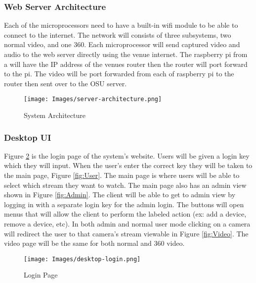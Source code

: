 \documentclass[onecolumn, draftclsnofoot,10pt, compsoc]{IEEEtran}
\begin{document}
        \subsubsection{Web Server Architecture}
        Each of the microprocessors need to have a built-in wifi module to be able to connect to the internet. 
        The network will consists of three subsystems, two normal video, and one 360. 
        Each microprocessor will send captured video and audio to the web server directly using the venue internet. 
        The raspberry pi from a will have the IP address of the venues router then the router will port forward to the pi. The video will be port forwarded from each of raspberry pi to the router then sent over to the OSU server.
        \vspace{1cm}
        \begin{figure}[H]
            \centering
            \texttt{[image: Images/server-architecture.png]}
            \centering\caption{System Architecture}
            \label{fig:Architecture}
        \end{figure}
        \pagebreak
        
        \subsubsection{Desktop UI}
        Figure \ref{fig:Login} is the login page of the system's website. Users will be given a login key which they will input. When the user's enter the correct key they will be taken to the main page, Figure \ref{fig:User}. The main page is where users will be able to select which stream they want to watch. The main page also has an admin view shown in Figure \ref{fig:Admin}. The client will be able to get to admin view by logging in with a separate login key for the admin login. The buttons will open menus that will allow the client to perform the labeled action (ex: add a device, remove a device, etc). In both admin and normal user mode clicking on a camera will redirect the user to that camera's stream viewable in Figure \ref{fig:Video}. The video page will be the same for both normal and 360 video.
        \vspace{1cm}
        \begin{figure}[H]
            \centering
            \texttt{[image: Images/desktop-login.png]}
            \centering\caption{Login Page}
            \label{fig:Login}
        \end{figure}
        
\end{document}
